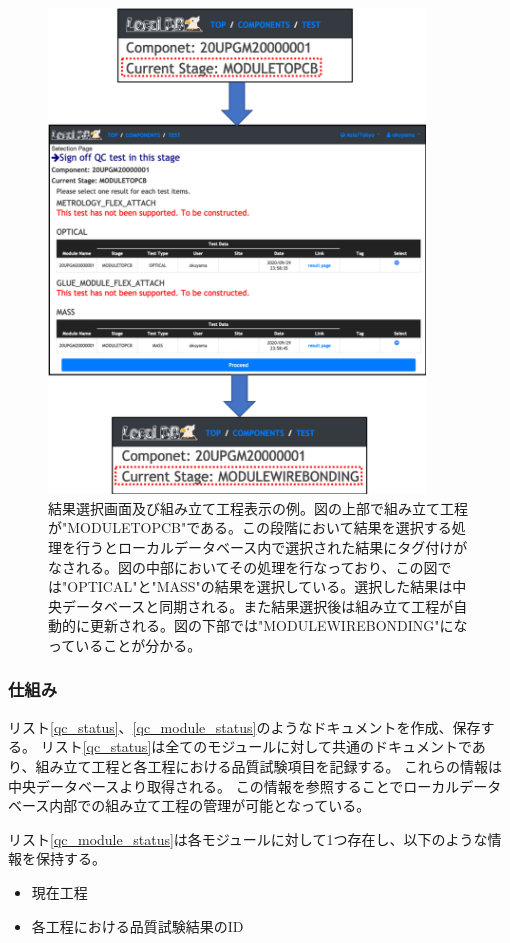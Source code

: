 \begin{figure}[bpt]\centering
\includegraphics[width=10cm]{webapp_sign_off}
\caption[結果選択画面及び組み立て工程表示の例]{結果選択画面及び組み立て工程表示の例。図の上部で組み立て工程が"MODULETOPCB"である。この段階において結果を選択する処理を行うとローカルデータベース内で選択された結果にタグ付けがなされる。図の中部においてその処理を行なっており、この図では"OPTICAL"と"MASS"の結果を選択している。選択した結果は中央データベースと同期される。また結果選択後は組み立て工程が自動的に更新される。図の下部では"MODULEWIREBONDING"になっていることが分かる。}
\label{webapp_sign_off}
\end{figure}

\newpage
\subsubsection{仕組み}
リスト\ref{qc_status}、\ref{qc_module_status}のようなドキュメントを作成、保存する。
リスト\ref{qc_status}は全てのモジュールに対して共通のドキュメントであり、組み立て工程と各工程における品質試験項目を記録する。
これらの情報は中央データベースより取得される。
この情報を参照することでローカルデータベース内部での組み立て工程の管理が可能となっている。

リスト\ref{qc_module_status}は各モジュールに対して1つ存在し、以下のような情報を保持する。
\begin{itemize}
  \item 現在工程
  \item 各工程における品質試験結果のID
\end{itemize}


